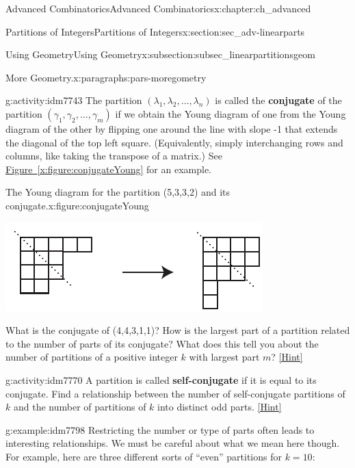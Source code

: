 \documentclass[oneside,10pt,]{book}
\newcommand{\terminology}[1]{\textbf{#1}}
\numberwithin{equation}{chapter}
\begin{document}
\begin{chapterptx}{Advanced Combinatorics}{}{Advanced Combinatorics}{}{}{x:chapter:ch_advanced}
\begin{sectionptx}{Partitions of Integers}{}{Partitions of Integers}{}{}{x:section:sec_adv-linearparts}
\begin{subsectionptx}{Using Geometry}{}{Using Geometry}{}{}{x:subsection:subsec_linearpartitionsgeom}
\begin{paragraphs}{More Geometry.}{x:paragraphs:pars-moregometry}
\begin{activity}{}{g:activity:idm7743}%
The partition \((\lambda_1,\lambda_2,\ldots, \lambda_n)\) is called the \terminology{conjugate} of the partition \((\gamma_1,\gamma_2,\ldots, \gamma_m)\) if we obtain the Young diagram of one from the Young diagram of the other by flipping one around the line with slope -1 that extends the diagonal of the top left square. (Equivalently, simply interchanging rows and columns, like taking the transpose of a matrix.) See \hyperref[x:figure:conjugateYoung]{Figure~\ref{x:figure:conjugateYoung}} for an example.%
\begin{figureptx}{The Young diagram for the partition (5,3,3,2) and its conjugate.}{x:figure:conjugateYoung}%
\begin{image}{0.25}{0.5}{0.25}%
\includegraphics[width=\linewidth]{images/conjugateYoung}
\end{image}%
\tcblower
\end{figureptx}%
What is the conjugate of (4,4,3,1,1)? How is the largest part of a partition related to the number of parts of its conjugate? What does this tell you about the number of partitions of a positive integer \(k\) with largest part \(m\)?%
\space\hspace*{0pt}\hfill{\tiny\hyperlink{g:hint:idm7761-back}{[Hint]}}\end{activity}
\begin{activity}{}{g:activity:idm7770}%
A partition is called \terminology{self-conjugate} if it is equal to its conjugate. Find a relationship between the number of self-conjugate partitions of \(k\) and the number of partitions of \(k\) into distinct odd parts.%
\space\hspace*{0pt}\hfill{\tiny\hyperlink{g:hint:idm7781-back}{[Hint]}}\end{activity}
\begin{example}{}{g:example:idm7798}%
Restricting the number or type of parts often leads to interesting relationships.  We must be careful about what we mean here though.  For example, here are three different sorts of ``even'' partitions for \(k = 10\):%

\end{example}
\end{paragraphs}
\end{subsectionptx}
\end{sectionptx}
\end{chapterptx}
\end{document}

